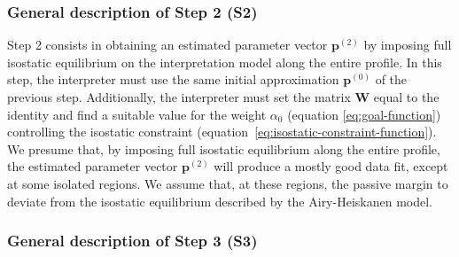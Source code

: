 \documentclass[manuscript]{geophysics}
\begin{document}
\subsubsection{General description of Step 2 (S2)}

Step 2 consists in obtaining an estimated parameter vector $\mathbf{p}^{(2)}$
by imposing full isostatic equilibrium on the interpretation model along the entire profile.
In this step, the interpreter must use the same initial approximation $\mathbf{p}^{(0)}$
of the previous step. 
Additionally, the interpreter must set the matrix $\mathbf{W}$
equal to the identity and find a suitable value for the weight $\alpha_{0}$ 
(equation \ref{eq:goal-function}) controlling the isostatic constraint 
(equation~\ref{eq:isostatic-constraint-function}).
We presume that, by imposing full isostatic equilibrium along the entire profile,
the estimated parameter vector $\mathbf{p}^{(2)}$ will produce a mostly good data fit,
except at some isolated regions. 
We assume that, at these regions, the passive margin to deviate
from the isostatic equilibrium described by the Airy-Heiskanen model.

\subsubsection{General description of Step 3 (S3)}
\end{document}

